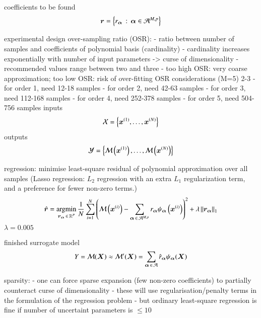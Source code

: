 coefficients to be found
\begin{equation}
    \bm r = \left\{r_{\bm{\alpha}} \,:\, {\bm{\alpha}} \in \mathcal{A}^{M,p}\right\}
\end{equation}

experimental design
over-sampling ratio (OSR):
- ratio between number of samples and coefficients of polynomial basis (cardinality) \cite{palar_multi-fidelity_2016}
- cardinality increases exponentially with number of input parameters -> curse of dimensionality
- recommended values range between two and three \cite{hosder2007,palar_multi-fidelity_2016,fajraoui_optimal_2017,gratiet_metamodel-based_2015}
- too high OSR: very coarse approximation; too low OSR: risk of over-fitting \cite{palar_multi-fidelity_2016}
OSR considerations (M=5) 2-3
- for order 1, need 12-18 samples
- for order 2, need 42-63 samples
- for order 3, need 112-168 samples
- for order 4, need 252-378 samples
- for order 5, need 504-756 samples
inputs
\begin{equation}
    \mathcal{X} = \left\{ \bm x^{(1)},\dots,\bm x^{(N)} \right\}
\end{equation}
outputs
\begin{equation}
    \mathcal{Y} = \left\{ \mathcal{M}\left(\bm x^{(1)}\right),\dots,\mathcal{M}\left(\bm x^{(N)}\right) \right\}
\end{equation}

regression: minimise least-square residual of polynomial approximation over all samples (Lasso regression: $L_2$ regression with an extra $L_1$ regularization term, and a preference for fewer non-zero terms.)
\begin{equation}
    \hat{\bm{r}} = \operatorname*{\arg\!\min}_{\bm{r}_{\bm{\alpha}} \,\in\, \mathbb{R}^P} \frac{1}{N} \sum_{i=1}^N \left(
        \mathcal{M} \left(\bm x^{(i)}\right) - \sum_{{\bm{\alpha}} \,\in\, \mathcal{A}^{M,p}} r_{\bm{\alpha}} \psi_{\bm{\alpha}}\left(\bm x^{(i)}\right)
    \right)^2  + \lambda \left\lVert\bm{r}_{\bm{\alpha}}\right\rVert_1
\end{equation}
$\lambda=0.005$

finished surrogate model
\begin{equation}
    Y = \mathcal{M}(\bm X) \approx \mathcal{M}'(\bm X) = \sum_{{\bm{\alpha}} \,\in\, \mathcal{A}} \hat{r}_{\bm{\alpha}} \psi_{\bm{\alpha}} (\bm X)
\end{equation}

sparsity:
- one can force sparse expansion (few non-zero coefficients) to partially counteract curse of dimensionality \cite{gratiet_metamodel-based_2015}
- these will use regularisation/penalty terms in the formulation of the regression problem
- but ordinary least-square regression is fine if number of uncertaint parameters is $\leq 10$ \cite{gratiet_metamodel-based_2015}

